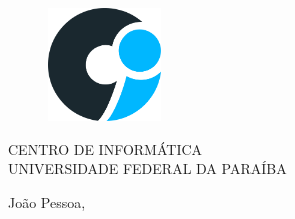 \pagestyle{empty} %
\begin{center}
\LARGE{\bf \thetitle}\\
\end{center}
\vspace{1em}
\begin{center}
\theauthor
\end{center}
\vfill
\begin{figure}[H]
\centering
	\includegraphics[width=3cm]{img/logo-ci.png}
\end{figure}
\begin{center}
CENTRO DE INFORMÁTICA \\
UNIVERSIDADE FEDERAL DA PARAÍBA
\end{center}
\vfill
\begin{center}
João Pessoa, \the\year
\end{center}